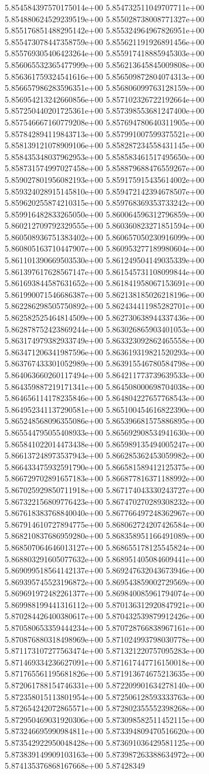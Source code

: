 	5.854584397570175014e+00	5.854732511049707711e+00	5.854880624529239519e+00	5.855028738008771327e+00	5.855176851488295142e+00	5.855324964967826951e+00	5.855473078447358759e+00	5.855621191926891456e+00	5.855769305406423264e+00	5.855917418885945303e+00	5.856065532365477999e+00	5.856213645845009808e+00	5.856361759324541616e+00	5.856509872804074313e+00	5.856657986283596351e+00	5.856806099763128159e+00	5.856954213242660856e+00	5.857102326722192664e+00	5.857250440201725361e+00	5.857398553681247400e+00	5.857546667160779208e+00	5.857694780640311905e+00	5.857842894119843713e+00	5.857991007599375521e+00	5.858139121078909106e+00	5.858287234558431145e+00	5.858435348037962953e+00	5.858583461517495650e+00	5.858731574997027458e+00	5.858879688476559267e+00	5.859027801956082193e+00	5.859175915435614002e+00	5.859324028915145810e+00	5.859472142394678507e+00	5.859620255874210315e+00	5.859768369353733242e+00	5.859916482833265050e+00	5.860064596312796859e+00	5.860212709792329555e+00	5.860360823271851594e+00	5.860508936751383402e+00	5.860657050230916099e+00	5.860805163710447907e+00	5.860953277189980604e+00	5.861101390669503530e+00	5.861249504149035339e+00	5.861397617628567147e+00	5.861545731108099844e+00	5.861693844587631652e+00	5.861841958067153691e+00	5.861990071546686387e+00	5.862138185026218196e+00	5.862286298505750892e+00	5.862434411985282701e+00	5.862582525464814509e+00	5.862730638944337436e+00	5.862878752423869244e+00	5.863026865903401053e+00	5.863174979382933749e+00	5.863323092862465558e+00	5.863471206341987596e+00	5.863619319821520293e+00	5.863767433301052989e+00	5.863915546780584798e+00	5.864063660260117494e+00	5.864211773739639533e+00	5.864359887219171341e+00	5.864508000698704038e+00	5.864656114178235846e+00	5.864804227657768543e+00	5.864952341137290581e+00	5.865100454616822390e+00	5.865248568096355086e+00	5.865396681575886895e+00	5.865544795055408933e+00	5.865692908534941630e+00	5.865841022014473438e+00	5.865989135494005247e+00	5.866137248973537943e+00	5.866285362453059982e+00	5.866433475932591790e+00	5.866581589412125375e+00	5.866729702891657183e+00	5.866877816371188992e+00	5.867025929850711918e+00	5.867174043330243727e+00	5.867322156809776423e+00	5.867470270289308232e+00	5.867618383768840040e+00	5.867766497248362967e+00	5.867914610727894775e+00	5.868062724207426584e+00	5.868210837686959280e+00	5.868358951166491089e+00	5.868507064646013127e+00	5.868655178125545824e+00	5.868803291605077632e+00	5.868951405084609441e+00	5.869099518564142137e+00	5.869247632043673946e+00	5.869395745523196872e+00	5.869543859002729569e+00	5.869691972482261377e+00	5.869840085961794074e+00	5.869988199441316112e+00	5.870136312920847921e+00	5.870284426400380617e+00	5.870432539879912426e+00	5.870580653359444234e+00	5.870728766838967161e+00	5.870876880318498969e+00	5.871024993798030778e+00	5.871173107277563474e+00	5.871321220757095283e+00	5.871469334236627091e+00	5.871617447716150018e+00	5.871765561195681826e+00	5.871913674675213635e+00	5.872061788154746331e+00	5.872209901634278140e+00	5.872358015113801954e+00	5.872506128593333763e+00	5.872654242072865571e+00	5.872802355552398268e+00	5.872950469031920306e+00	5.873098582511452115e+00	5.873246695990984811e+00	5.873394809470516620e+00	5.873542922950048428e+00	5.873691036429581125e+00	5.873839149909103163e+00	5.873987263388634972e+00	5.874135376868167668e+00	5.87428349